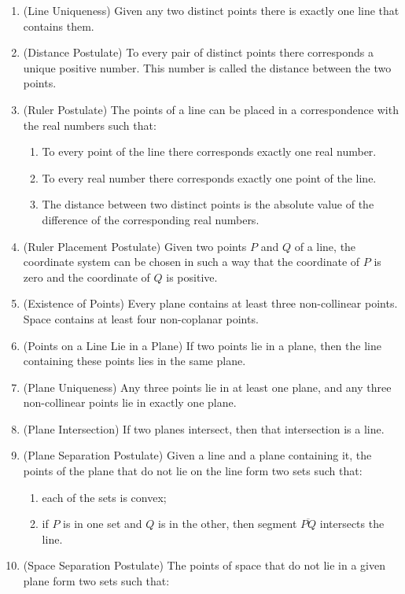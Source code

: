 \documentclass[
]{book}
\providecommand{\tightlist}{%
  \setlength{\itemsep}{0pt}\setlength{\parskip}{0pt}}
\theoremstyle{definition}
\theoremstyle{definition}
\theoremstyle{definition}
\theoremstyle{definition}
\theoremstyle{remark}
\begin{document}
\begin{enumerate}
\def\labelenumi{\arabic{enumi}.}
\item
  (Line Uniqueness) Given any two distinct points there is exactly one line that contains them.
\item
  (Distance Postulate) To every pair of distinct points there corresponds a unique positive number. This number is called the distance between the two points.
\item
  (Ruler Postulate) The points of a line can be placed in a correspondence with the real numbers such that:

  \begin{enumerate}
  \def\labelenumii{\alph{enumii}.}
  \tightlist
  \item
    To every point of the line there corresponds exactly one real number.
  \item
    To every real number there corresponds exactly one point of the line.
  \item
    The distance between two distinct points is the absolute value of the difference of the corresponding real numbers.
  \end{enumerate}
\item
  (Ruler Placement Postulate) Given two points \(P\) and \(Q\) of a line, the coordinate system can be chosen in such a way that the coordinate of \(P\) is zero and the coordinate of \(Q\) is positive.
\item
  (Existence of Points) Every plane contains at least three non-collinear points. Space contains at least four non-coplanar points.
\item
  (Points on a Line Lie in a Plane) If two points lie in a plane, then the line containing these points lies in the same plane.
\item
  (Plane Uniqueness) Any three points lie in at least one plane, and any three non-collinear points lie in exactly one plane.
\item
  (Plane Intersection) If two planes intersect, then that intersection is a line.
\item
  (Plane Separation Postulate) Given a line and a plane containing it, the points of the plane that do not lie on the line form two sets such that:

  \begin{enumerate}
  \def\labelenumii{\alph{enumii}.}
  \tightlist
  \item
    each of the sets is convex;
  \item
    if \(P\) is in one set and \(Q\) is in the other, then segment \(\overline{PQ}\) intersects the line.
  \end{enumerate}
\item
  (Space Separation Postulate) The points of space that do not lie in a given plane form two sets such that:


\end{enumerate}
\end{document}
